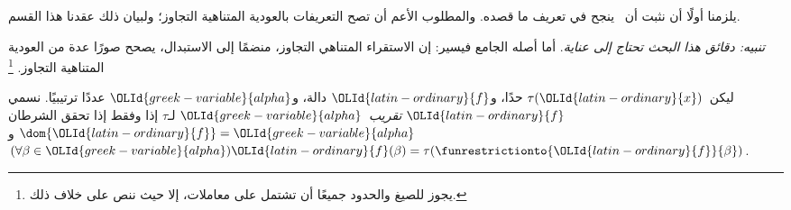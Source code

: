 \documentclass[../../../include/open-logic-section]{subfiles}
\begin{document}

يلزمنا أولًا أن نثبت أن~ ينجح في تعريف
ما قصده. والمطلوب الأعم أن تصح التعريفات بالعودية المتناهية التجاوز؛
ولبيان ذلك عقدنا هذا القسم.

\emph{تنبيه: دقائق هذا البحث تحتاج إلى عناية}. أما أصله الجامع
فيسير: إن الاستقراء المتناهي التجاوز، منضمًا إلى الاستبدال، يصحح
صورًا عدة من العودية المتناهية التجاوز.
\footnote{يجوز للصيغ والحدود جميعًا أن تشتمل على معاملات، إلا حيث
ننص على خلاف ذلك.}

\begin{defn}
ليكن~$\tau({\OLId{latin-ordinary}{x}})$ حدًا، و${\OLId{latin-ordinary}{f}}$ دالة، و${\OLId{greek-variable}{alpha}}$ عددًا ترتيبيًا. نسمي
${\OLId{latin-ordinary}{f}}$ \emph{تقريب~${\OLId{greek-variable}{alpha}}$} لـ$\tau$ إذا وفقط إذا تحقق الشرطان
$\dom{{\OLId{latin-ordinary}{f}}} = {\OLId{greek-variable}{alpha}}$ و
$(\forall \beta \in {\OLId{greek-variable}{alpha}}){\OLId{latin-ordinary}{f}}(\beta) = \tau(\funrestrictionto{{\OLId{latin-ordinary}{f}}}{\beta})$.
\end{defn}
\end{document}
